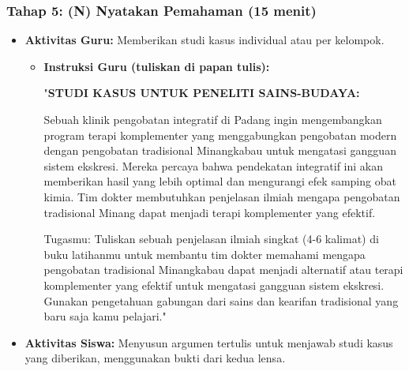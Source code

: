 \documentclass[a4paper,12pt]{article}
\begin{document}
\subsubsection{Tahap 5: (N) Nyatakan Pemahaman (15 menit)}
\begin{itemize}
\item \textbf{Aktivitas Guru:} Memberikan studi kasus individual atau per kelompok.
    \begin{itemize}
    \item \textbf{Instruksi Guru (tuliskan di papan tulis):}
    
    "\textbf{STUDI KASUS UNTUK PENELITI SAINS-BUDAYA:}
    
    Sebuah klinik pengobatan integratif di Padang ingin mengembangkan program terapi komplementer yang menggabungkan pengobatan modern dengan pengobatan tradisional Minangkabau untuk mengatasi gangguan sistem ekskresi. Mereka percaya bahwa pendekatan integratif ini akan memberikan hasil yang lebih optimal dan mengurangi efek samping obat kimia. Tim dokter membutuhkan penjelasan ilmiah mengapa pengobatan tradisional Minang dapat menjadi terapi komplementer yang efektif.
    
    Tugasmu: Tuliskan sebuah penjelasan ilmiah singkat (4-6 kalimat) di buku latihanmu untuk membantu tim dokter memahami mengapa pengobatan tradisional Minangkabau dapat menjadi alternatif atau terapi komplementer yang efektif untuk mengatasi gangguan sistem ekskresi. Gunakan pengetahuan gabungan dari sains dan kearifan tradisional yang baru saja kamu pelajari."
    \end{itemize}
\item \textbf{Aktivitas Siswa:} Menyusun argumen tertulis untuk menjawab studi kasus yang diberikan, menggunakan bukti dari kedua lensa.
\end{itemize}
\end{document}
